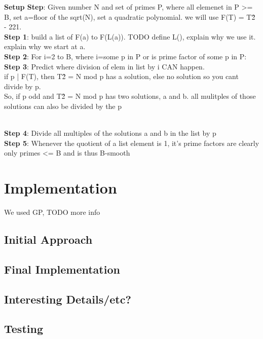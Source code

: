 \documentclass[titlepage]{article}
\begin{document}
		\noindent\textbf{Setup Step}: Given number N and set of primes P, where all elemenet in P >= B, set a=floor of the sqrt(N), set a quadratic polynomial. we will use F(T) = T\^2 - 221.\\

		\noindent\textbf{Step 1}: build a list of F(a) to F(L(a)). TODO define L(), explain why we use it. explain why we start at a.\\

		\noindent\textbf{Step 2}: For i=2 to B, where i=some p in P or is prime factor of some p in P:\\
	
		\noindent\textbf{Step 3}: Predict where division of elem in list by i CAN happen.\\
		if p | F(T), then T\^2 = N mod p has a solution, else no solution so you cant divide by p.\\
		So, if p odd  and T\^2 = N mod p has two solutions, a and b. all mulitples of those solutions can also be divided by the p\\\

		\noindent\textbf{Step 4}: Divide all multiples of the solutions a and b in the list by p\\

		\noindent\textbf{Step 5}: Whenever the quotient of a list element is 1,  it's prime factors are clearly only primes <= B and is thus B-smooth\\ 
	  
	\section{Implementation}
	We used GP, TODO more info
	
		\subsection{Initial Approach}
	
		\subsection{Final Implementation}
	
		\subsection{Interesting Details/etc?}
	
		\subsection{Testing}
	
\end{document}
